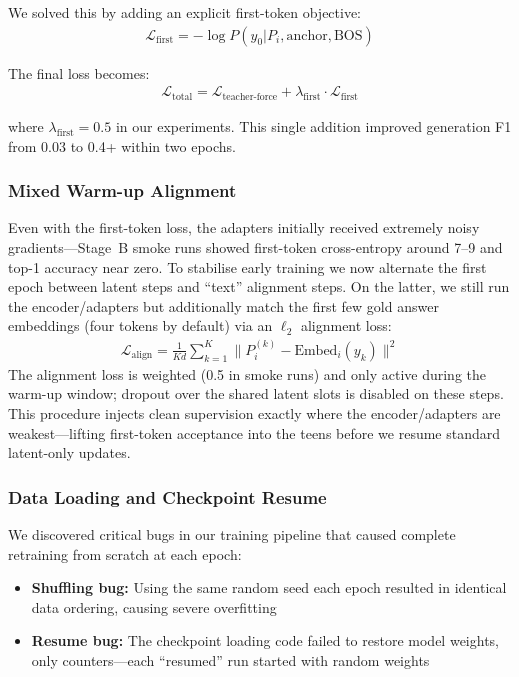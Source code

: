 \documentclass{article}
\begin{document}
We solved this by adding an explicit first-token objective:
\begin{align}
\mathcal{L}_{\text{first}} = -\log P(y_0 | P_i, \text{anchor}, \text{BOS})
\end{align}

The final loss becomes:
\begin{align}
\mathcal{L}_{\text{total}} = \mathcal{L}_{\text{teacher-force}} + \lambda_{\text{first}} \cdot \mathcal{L}_{\text{first}}
\end{align}

where $\lambda_{\text{first}} = 0.5$ in our experiments. This single addition improved generation F1 from 0.03 to 0.4+ within two epochs.

\subsubsection{Mixed Warm-up Alignment}

Even with the first-token loss, the adapters initially received extremely noisy gradients—Stage~B smoke runs showed first-token cross-entropy around 7--9 and top-1 accuracy near zero. To stabilise early training we now alternate the first epoch between latent steps and ``text'' alignment steps. On the latter, we still run the encoder/adapters but additionally match the first few gold answer embeddings (four tokens by default) via an $\ell_2$ alignment loss:
\begin{align}
\mathcal{L}_{\text{align}} = \frac{1}{K d} \sum_{k=1}^{K} \lVert P_i^{(k)} - \text{Embed}_i(y_k) \rVert^2
\end{align}
The alignment loss is weighted (0.5 in smoke runs) and only active during the warm-up window; dropout over the shared latent slots is disabled on these steps. This procedure injects clean supervision exactly where the encoder/adapters are weakest—lifting first-token acceptance into the teens before we resume standard latent-only updates.

\subsubsection{Data Loading and Checkpoint Resume}

We discovered critical bugs in our training pipeline that caused complete retraining from scratch at each epoch:
\begin{itemize}
\item \textbf{Shuffling bug:} Using the same random seed each epoch resulted in identical data ordering, causing severe overfitting
\item \textbf{Resume bug:} The checkpoint loading code failed to restore model weights, only counters—each ``resumed'' run started with random weights
\end{itemize}
\end{document}
